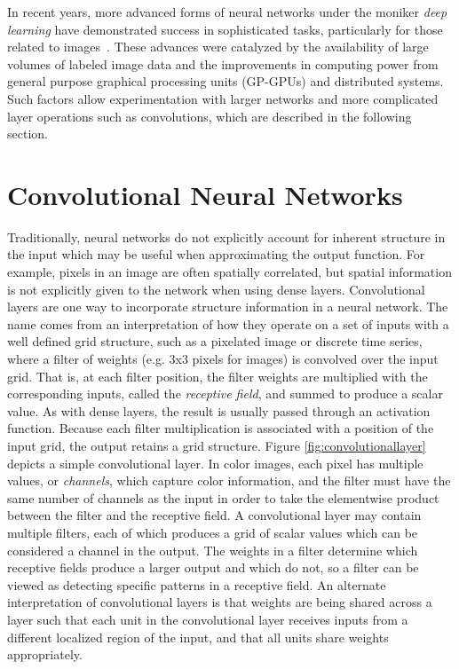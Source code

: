 In recent years, more advanced forms of neural networks under the moniker \textit{deep learning} have demonstrated success in sophisticated tasks, particularly for those related to images~\cite{lecun2015}. 
These advances were catalyzed by the availability of large volumes of labeled image data and the improvements in computing power from general purpose graphical processing units (GP-GPUs) and distributed systems.
Such factors allow experimentation with larger networks and more complicated layer operations such as convolutions, which are described in the following section.

\section{Convolutional Neural Networks}

Traditionally, neural networks do not explicitly account for inherent structure in the input which may be useful when approximating the output function.
For example, pixels in an image are often spatially correlated, but spatial information is not explicitly given to the network when using dense layers.
Convolutional layers are one way to incorporate structure information in a neural network. 
The name comes from an interpretation of how they operate on a set of inputs with a well defined grid structure, such as a pixelated image or discrete time series, where a filter of weights (e.g. 3x3 pixels for images) is convolved over the input grid.
That is, at each filter position, the filter weights are multiplied with the corresponding inputs, called the \textit{receptive field}, and summed to produce a scalar value.
As with dense layers, the result is usually passed through an activation function.
Because each filter multiplication is associated with a position of the input grid, the output retains a grid structure.
Figure \ref{fig:convolutionallayer} depicts a simple convolutional layer.
In color images, each pixel has multiple values, or \textit{channels}, which capture color information, and the filter must have the same number of channels as the input in order to take the elementwise product between the filter and the receptive field.
A convolutional layer may contain multiple filters, each of which produces a grid of scalar values which can be considered a channel in the output.
The weights in a filter determine which receptive fields produce a larger output and which do not, so a filter can be viewed as detecting specific patterns in a receptive field.
An alternate interpretation of convolutional layers is that weights are being shared across a layer such that each unit in the convolutional layer receives inputs from a different localized region of the input, and that all units share weights appropriately.

